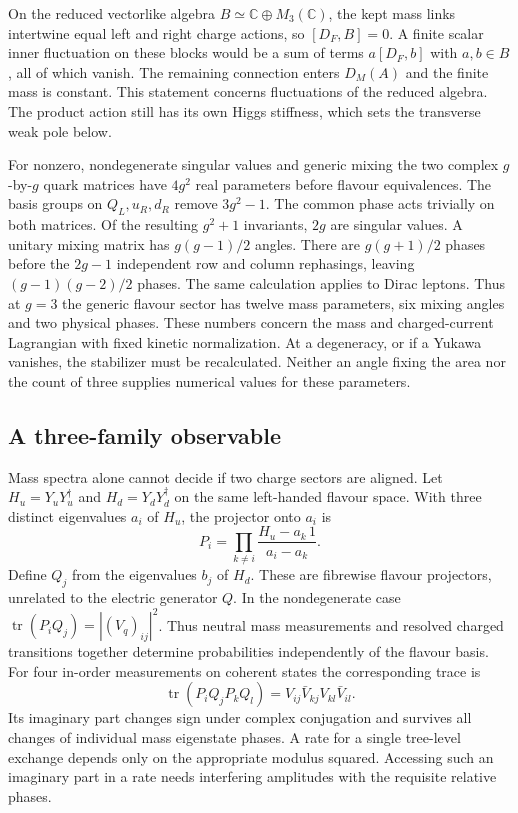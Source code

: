 \documentclass[aps,prd,reprint,onecolumn,nofootinbib,amsmath,amssymb]{revtex4-2}
\begin{document}
On the reduced vectorlike algebra $B\simeq\mathbb C\oplus M_3(\mathbb C)$, the kept mass links intertwine equal left and right charge actions, so $[D_F,B]=0$. A finite scalar inner fluctuation on these blocks would be a sum of terms $a[D_F,b]$ with $a,b\in B$, all of which vanish. The remaining connection enters $D_M(A)$ and the finite mass is constant. This statement concerns fluctuations of the reduced algebra. The product action still has its own Higgs stiffness, which sets the transverse weak pole below.

For nonzero, nondegenerate singular values and generic mixing the two complex $g$-by-$g$ quark matrices have $4g^2$ real parameters before flavour equivalences. The basis groups on $Q_L,u_R,d_R$ remove $3g^2-1$. The common phase acts trivially on both matrices. Of the resulting $g^2+1$ invariants, $2g$ are singular values. A unitary mixing matrix has $g(g-1)/2$ angles. There are $g(g+1)/2$ phases before the $2g-1$ independent row and column rephasings, leaving $(g-1)(g-2)/2$ phases. The same calculation applies to Dirac leptons. Thus at $g=3$ the generic flavour sector has twelve mass parameters, six mixing angles and two physical phases. These numbers concern the mass and charged-current Lagrangian with fixed kinetic normalization. At a degeneracy, or if a Yukawa vanishes, the stabilizer must be recalculated. Neither an angle fixing the area nor the count of three supplies numerical values for these parameters.

\subsection{A three-family observable}
Mass spectra alone cannot decide if two charge sectors are aligned. Let $H_u=Y_uY_u^\dagger$ and $H_d=Y_dY_d^\dagger$ on the same left-handed flavour space. With three distinct eigenvalues $a_i$ of $H_u$, the projector onto $a_i$ is
\begin{equation}
 P_i=\prod_{k\ne i}\frac{H_u-a_k\,1}{a_i-a_k}.
\end{equation}
Define $Q_j$ from the eigenvalues $b_j$ of $H_d$. These are fibrewise flavour projectors, unrelated to the electric generator $Q$. In the nondegenerate case $\operatorname{tr}(P_iQ_j)=|(V_q)_{ij}|^2$. Thus neutral mass measurements and resolved charged transitions together determine probabilities independently of the flavour basis. For four in-order measurements on coherent states the corresponding trace is
\begin{equation}
 \operatorname{tr}(P_i Q_j P_k Q_l)
 =V_{ij}\bar V_{kj} V_{kl}\bar V_{il}.
\end{equation}
Its imaginary part changes sign under complex conjugation and survives all changes of individual mass eigenstate phases. A rate for a single tree-level exchange depends only on the appropriate modulus squared. Accessing such an imaginary part in a rate needs interfering amplitudes with the requisite relative phases.
\end{document}
